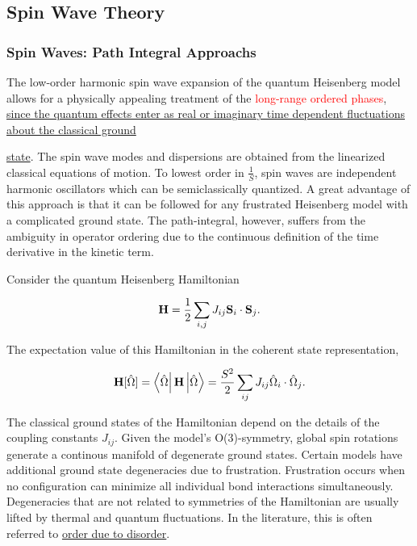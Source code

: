 \clearpage

\subsection{Spin Wave Theory}

\tableofcontents

\subsubsection{Spin Waves: Path Integral Approachs}

\blanky \bigbreak

\begin{tcolorbox}[colback = yellow, title = Physical Context]

The low-order harmonic spin wave expansion of the quantum Heisenberg model allows for a physically appealing treatment of the \textcolor{red}{long-range ordered phases}, \underline{since the quantum effects enter as real or imaginary}\underline{ time dependent fluctuations about the classical ground}

\underline{state}. The spin wave modes and dispersions are obtained from the linearized classical equations of motion. To lowest order in $\frac{1}{S}$, spin waves are independent harmonic oscillators which can be semiclassically quantized. A great advantage of this approach is that it can be followed for any frustrated Heisenberg model with a complicated ground state. The path-integral, however, suffers from the ambiguity in operator ordering due to the continuous definition of the time derivative in the kinetic term. 

\end{tcolorbox}

Consider the quantum Heisenberg Hamiltonian 

$$
    {\bf H} = \frac{1}{2} \sum_{i,j} J_{ij} {\bf S}_i \cdot {\bf S}_j. 
$$

The expectation value of this Hamiltonian in the coherent state representation, 

\begin{equation}
    {\bf H}[\hat{\Omega}] = \bra{\hat{\Omega}} {{\bf H}} \ket{\hat{\Omega}} = \frac{S^2}{2} \sum_{ij} J_{ij} \hat{\Omega}_i \cdot \hat{\Omega}_j.
\end{equation}

The classical ground states of the Hamiltonian depend on the details of the coupling constants $J_{ij}$. Given the model's O(3)-symmetry, global spin rotations generate a continous manifold of degenerate ground states. Certain models have additional ground state degeneracies due to frustration. Frustration occurs when no configuration can minimize all individual bond interactions simultaneously. Degeneracies that are not related to symmetries of the Hamiltonian are usually lifted by thermal and quantum fluctuations. In the literature, this is often referred to \underline{order due to disorder}. \\

